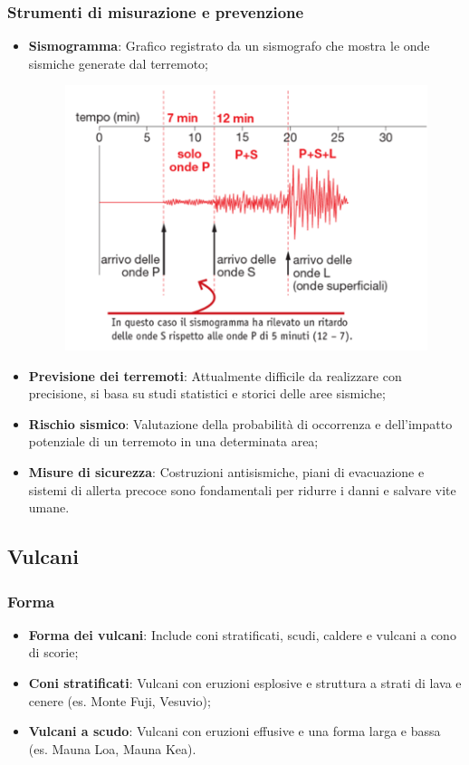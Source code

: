 \documentclass{article}
\begin{document}
\subsubsection{Strumenti di misurazione e prevenzione}
\begin{itemize}
    \item \textbf{Sismogramma}: Grafico registrato da un sismografo che mostra le onde sismiche
        generate dal terremoto;
\begin{figure}[ht!]
    \begin{center}
        \includegraphics[width=.4\textwidth]{media/geo_fisica/simsogramma.png}
    \end{center}
\end{figure}

    \item \textbf{Previsione dei terremoti}: Attualmente difficile da realizzare con precisione,
        si basa su studi statistici e storici delle aree sismiche;
    \item \textbf{Rischio sismico}: Valutazione della probabilità di occorrenza e dell'impatto
        potenziale di un terremoto in una determinata area;
    \item \textbf{Misure di sicurezza}: Costruzioni antisismiche, piani di evacuazione e sistemi
        di allerta precoce sono fondamentali per ridurre i danni e salvare vite umane.
\end{itemize}

\subsection{Vulcani}
\subsubsection{Forma}
\begin{itemize}
    \item \textbf{Forma dei vulcani}: Include coni stratificati, scudi, caldere e vulcani a cono
        di scorie;
    \item \textbf{Coni stratificati}: Vulcani con eruzioni esplosive e struttura a strati di
        lava e cenere (es. Monte Fuji, Vesuvio);
    \item \textbf{Vulcani a scudo}: Vulcani con eruzioni effusive e una forma larga e bassa
        (es. Mauna Loa, Mauna Kea).
\end{itemize}
\end{document}
